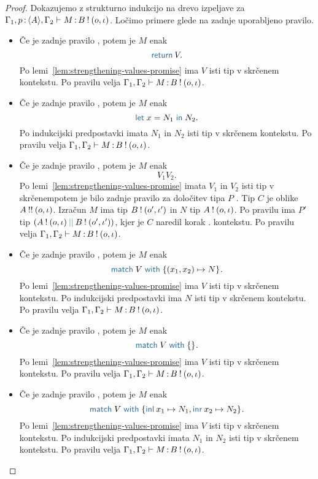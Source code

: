 \begin{proof}
	Dokazujemo z strukturno indukcijo na drevo izpeljave za $\Gamma_1, p \mathinner{:} \langle A \rangle, \Gamma_2 \vdash M \mathinner{:} B \mathbin{!} (o, \iota)$.
	Ločimo primere glede na zadnje uporabljeno pravilo.
	
	\begin{itemize}
		\item Če je zadnje pravilo , potem je $M$ enak $$\tmreturn{V}.$$
		Po lemi~\ref{lem:strengthening-values-promise} ima $V$ isti tip v skrčenem kontekstu.
		Po pravilu  velja $\Gamma_1, \Gamma_2 \vdash M \mathinner{:} B \mathbin{!} (o, \iota)$.
		
		\item Če je zadnje pravilo , potem je $M$ enak $$\tmlet{x}{N_1}{N_2}.$$
		Po indukcijski predpostavki imata $N_1$ in $N_2$ isti tip v skrčenem kontekstu.
		Po pravilu  velja $\Gamma_1, \Gamma_2 \vdash M \mathinner{:} B \mathbin{!} (o, \iota)$.
		
		\item Če je zadnje pravilo , potem je $M$ enak $$V_1 V_2.$$
		Po lemi~\ref{lem:strengthening-values-promise} imata $V_1$ in $V_2$ isti tip v skrčenempotem je bilo zadnje pravilo za določitev tipa $P$ . Tip $C$ je oblike $A \mathbin{!!} (o, \iota)$.
		Izračun $M$ ima tip $B \mathbin{!} (o', \iota')$ in $N$ tip $A \mathbin{!} (o, \iota)$.
		Po pravilu  ima $P'$ tip $\typar{\tycomp{A}{\o, \i}}{\tycomp{B}{\o', \i'}}$, kjer je $C$ naredil korak . kontekstu.
		Po pravilu  velja $\Gamma_1, \Gamma_2 \vdash M \mathinner{:} B \mathbin{!} (o, \iota)$.
		
		\item Če je zadnje pravilo , potem je $M$ enak $$\tmmatch{V}{(x_1,x_2) \mapsto N}.$$ 
		Po lemi~\ref{lem:strengthening-values-promise} ima $V$ isti tip v skrčenem kontekstu.
		Po indukcijski predpostavki ima $N$ isti tip v skrčenem kontekstu.
		Po pravilu  velja $\Gamma_1, \Gamma_2 \vdash M \mathinner{:} B \mathbin{!} (o, \iota)$.
		
		\item Če je zadnje pravilo , potem je $M$ enak $$\tmmatch{V}{}.$$
		Po lemi~\ref{lem:strengthening-values-promise} ima $V$ isti tip v skrčenem kontekstu.
		Po pravilu  velja $\Gamma_1, \Gamma_2 \vdash M \mathinner{:} B \mathbin{!} (o, \iota)$.
		
		\item Če je zadnje pravilo , potem je $M$ enak $$\tmmatch{V}{\tminl{x_1} \mapsto N_1, \tminr{x_2} \mapsto N_2}.$$
		Po lemi~\ref{lem:strengthening-values-promise} ima $V$ isti tip v skrčenem kontekstu.
		Po indukcijski predpostavki imata $N_1$ in $N_2$ isti tip v skrčenem kontekstu.
		Po pravilu  velja $\Gamma_1, \Gamma_2 \vdash M \mathinner{:} B \mathbin{!} (o, \iota)$.
		

\end{itemize}
\end{proof}
